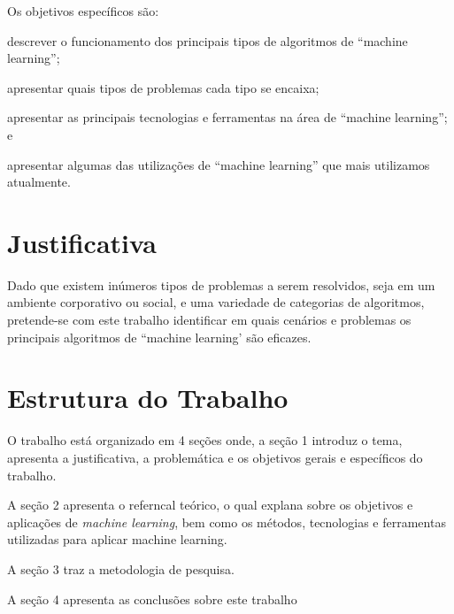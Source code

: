 	Os objetivos específicos são: 

	\begin{alineas}
		\item descrever o funcionamento dos principais tipos de algoritmos de “machine learning”;
		\item apresentar quais tipos de problemas cada tipo se encaixa;
		\item apresentar as principais tecnologias e ferramentas na área de “machine learning”; e
		\item apresentar algumas das utilizações de “machine learning” que mais utilizamos atualmente.		
	\end{alineas}

\section{Justificativa}
\label{sec:justificativa}

Dado que existem inúmeros tipos de problemas a serem resolvidos, seja em um ambiente corporativo ou social, 
e uma variedade de categorias de algoritmos, pretende-se com este trabalho identificar em quais 
cenários e problemas os principais algoritmos de “machine learning’ são eficazes.

\section{Estrutura do Trabalho}
\label{sec:estrutura-trabalho}

O trabalho está organizado em 4 seções onde, a seção 1 introduz o tema, apresenta a justificativa, a problemática e os objetivos
gerais e específicos do trabalho.

A seção 2 apresenta o referncal teórico, o qual explana sobre os objetivos e aplicações de  \textit{machine learning}, 
bem como os métodos, tecnologias e ferramentas utilizadas para aplicar machine learning.    	   


A seção 3 traz a metodologia de pesquisa. 


A seção 4 apresenta as conclusões sobre este trabalho
